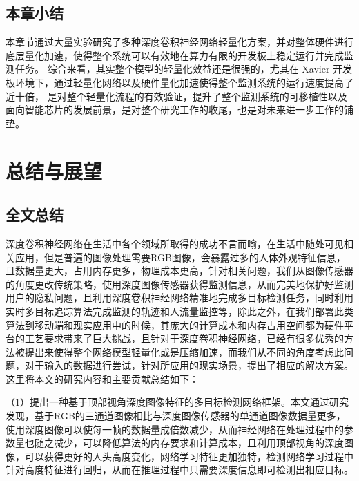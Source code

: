 \section{本章小结}
\label{sec4-5}
本章节通过大量实验研究了多种深度卷积神经网络轻量化方案，并对整体硬件进行底层量化加速，使得整个系统可以有效地在算力有限的开发板上稳定运行并完成监测任务。
综合来看，其实整个模型的轻量化效益还是很强的，尤其在 Xavier 开发板环境下，通过轻量化网络以及硬件量化加速使得整个监测系统的运行速度提高了近十倍，
是对整个轻量化流程的有效验证，提升了整个监测系统的可移植性以及面向智能芯片的发展前景，是对整个研究工作的收尾，也是对未来进一步工作的铺垫。



\chapter{总结与展望}
\label{chap5}
\section{全文总结}

深度卷积神经网络在生活中各个领域所取得的成功不言而喻，在生活中随处可见相关应用，但是普遍的图像处理需要RGB图像，会暴露过多的人体外观特征信息，且数据量更大，占用内存更多，物理成本更高，针对相关问题，我们从图像传感器的角度更改传统策略，使用深度图像传感器获得监测信息，从而完美地保护好监测用户的隐私问题，且利用深度卷积神经网络精准地完成多目标检测任务，同时利用实时多目标追踪算法完成监测的轨迹和人流量监控等，除此之外，在我们部署此类算法到移动端和现实应用中的时候，其庞大的计算成本和内存占用空间都为硬件平台的工艺要求带来了巨大挑战，且针对于深度卷积神经网络，已经有很多优秀的方法被提出来使得整个网络模型轻量化或是压缩加速，而我们从不同的角度考虑此问题，对于输入的数据进行尝试，针对所应用的现实场景，提出了相应的解决方案。这里将本文的研究内容和主要贡献总结如下：

（1）提出一种基于顶部视角深度图像特征的多目标检测网络框架。本文通过研究发现，基于RGB的三通道图像相比与深度图像传感器的单通道图像数据量更多，使用深度图像可以使每一帧的数据量成倍数减少，从而神经网络在处理过程中的参数量也随之减少，可以降低算法的内存要求和计算成本，且利用顶部视角的深度图像，可以获得更好的人头高度变化，网络学习特征更加独特，检测网络学习过程中针对高度特征进行回归，从而在推理过程中只需要深度信息即可检测出相应目标。

